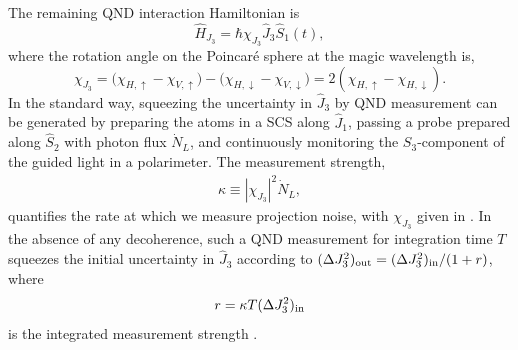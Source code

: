 \documentclass[preprint, aps,pra,onecolumn]{revtex4-1} %
\newcommand{\inp}{{\rm in}}
\newcommand{\jx}{\hat{J}_1}
\newcommand{\jz}{\hat{J}_3}
\newcommand{\chieff}{\chi_{J_3}}
\begin{document}
The remaining QND interaction Hamiltonian is
	\begin{equation} \label{Eq::FaradayHam}
		\hat{H}_{J_3} = \hbar \chieff \jz \hat{S}_1(t),
	\end{equation}
where the rotation angle on the Poincar\'{e} sphere at the magic wavelength is,
\begin{equation}\label{eq:chiJ3}
\chieff = \big( \chi_{H, \uparrow} - \chi_{V,\uparrow} \big) - \big(\chi_{H,\downarrow} - \chi_{V,\downarrow} \big) = 2(\chi_{H, \uparrow}-\chi_{H, \downarrow}).
\end{equation}
In the standard way, squeezing the uncertainty in $\jz$ by QND measurement can be generated by preparing the atoms in a SCS along $\jx$, passing a probe prepared along $\hat{S}_2$ with photon flux $\dot{N}_L$, and continuously monitoring the $S_3$-component of the guided light in a polarimeter. The measurement strength,
	\begin{align} \label{Eq::MeasurementStrength}
		\kappa \equiv |\chieff|^2 \dot{N}_L, 
	\end{align}
quantifies the rate at which we measure projection noise, with $\chieff$ given in . 
In the absence of any decoherence, such a QND measurement for integration time $T$ squeezes the initial uncertainty in $\jz$ according to $(\Delta J_3^2)_{\rm out}= (\Delta J_3^2)_{\rm in}/(1+r)$, where
	\begin{equation}
		r = \kappa T  (\Delta J_3^2)_{\inp}
	\end{equation}
is the integrated measurement strength \cite{hammerer_quantum_2010, baragiola_three-dimensional_2014}.
\end{document}
